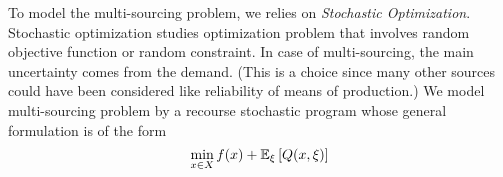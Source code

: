 To model the multi-sourcing problem, we relies on \emph{Stochastic Optimization}.
Stochastic optimization studies optimization problem that involves random objective function or random constraint.
In case of multi-sourcing, the main uncertainty comes from the demand.
(This is a choice since many other sources could have been considered like reliability of means of production.)
We model multi-sourcing problem by a recourse stochastic program whose general formulation is of the form
\begin{equation}
  \min_{x \in X} f(x) + \espe_{\xi}\sqbracket{Q\bracket{x,\xi}}
\end{equation}
